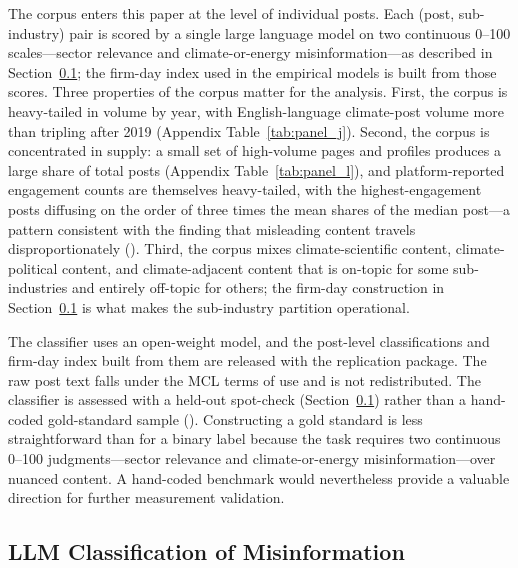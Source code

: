 \documentclass{article}
\theoremstyle{plain}
\begin{document}
The corpus enters this paper at the level of individual posts. Each (post, sub-industry) pair is scored by a single large language model on two continuous 0--100 scales---sector relevance and climate-or-energy misinformation---as described in Section~\ref{sec:LLM}; the firm-day index used in the empirical models is built from those scores. Three properties of the corpus matter for the analysis. First, the corpus is heavy-tailed in volume by year, with English-language climate-post volume more than tripling after 2019 (Appendix Table~\ref{tab:panel_j}). Second, the corpus is concentrated in supply: a small set of high-volume pages and profiles produces a large share of total posts (Appendix Table~\ref{tab:panel_l}), and platform-reported engagement counts are themselves heavy-tailed, with the highest-engagement posts diffusing on the order of three times the mean shares of the median post---a pattern consistent with the finding that misleading content travels disproportionately (\cite{VosoughiRoyAral2018}). Third, the corpus mixes climate-scientific content, climate-political content, and climate-adjacent content that is on-topic for some sub-industries and entirely off-topic for others; the firm-day construction in Section~\ref{sec:LLM} is what makes the sub-industry partition operational.

The classifier uses an open-weight model, and the post-level classifications and firm-day index built from them are released with the replication package. The raw post text falls under the MCL terms of use and is not redistributed. The classifier is assessed with a held-out spot-check (Section~\ref{sec:LLM}) rather than a hand-coded gold-standard sample (\cite{grimmer2022text}). Constructing a gold standard is less straightforward than for a binary label because the task requires two continuous 0--100 judgments---sector relevance and climate-or-energy misinformation---over nuanced content. A hand-coded benchmark would nevertheless provide a valuable direction for further measurement validation.

\subsection{LLM Classification of Misinformation}
\label{sec:LLM}
\end{document}
